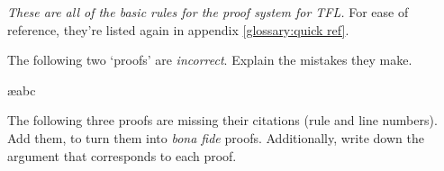 \emph{These are all of the basic rules for the proof system for TFL.} For ease of reference, they're listed again in appendix \ref{glossary:quick ref}.

\practiceproblems

\problempart
The following two `proofs' are \emph{incorrect}. Explain the mistakes they make.
\begin{pf}
\LEM
\open
\close
\open
\close
{}
\end{pf}

\begin{pf}
\ae{abc}
\end{pf}

\problempart
The following three proofs are missing their citations (rule and line numbers). Add them, to turn them into \emph{bona fide} proofs. Additionally, write down the argument that corresponds to each proof.
\begin{multicols}{2}
\begin{pf}
\end{pf}

\begin{pf}
\open
\close
{}%
\end{pf}

\begin{pf}
\open
\close
\open
\close
{}%
\end{pf}
\end{multicols}

